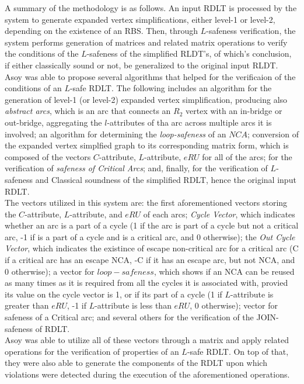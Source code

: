     A summary of the methodology is as follows. An input RDLT is processed by the system to generate expanded vertex simplifications, either level-1 or level-2, depending on the existence of an RBS. Then, through $L$-safeness verification, the system performs generation of matrices and related matrix operations to verify the conditions of the $L$-safeness of the simplified RLDT's, of which's conclusion, if either classically sound or not, be generalized to the original input RLDT. \\

    Asoy \cite{Asoy2024} was able to propose several algorithms that helped for the verificaion of the conditions of an $L$-safe RDLT. The following includes an algorithm for the generation of level-1 (or level-2) expanded vertex simplification, producing also \textit{abstract arcs}, which is an arc that connects an $R_2$ vertex with an in-bridge or out-bridge, aggregating the $l$-attributes of tha arc across multiple arcs it is involved; an algorithm for determining the \textit{loop-safeness} of an $NCA$; conversion of the expanded vertex simplfied graph to its corresponding matrix form, which is composed of the vectors $C$-attribute, $L$-attribute, $eRU$ for all of the arcs; for the verification of \textit{safeness of Critical Arcs}; and, finally, for the verification of $L$-safeness and Classical soundness of the simplified RDLT, hence the original input RDLT. \\

    The vectors utilized in this system are: the first aforementioned vectors storing the $C$-attribute, $L$-attribute, and $eRU$ of each arcs; \textit{Cycle Vector}, which indicates whether an arc is a part of a cycle (1 if the arc is part of a cycle but not a critical arc, -1 if is a part of a cycle and is a critical arc, and 0 otherwise); the \textit{Out Cycle Vector}, which indicates the existince of escape non-critical arc for a critical arc (C if a critical arc has an escape NCA, -C if it has an escape arc, but not NCA, and 0 otherwise); a vector for $loop-safeness$, which shows if an NCA can be reused as many times as it is required from all the cycles it is associated with, provied its value on the cycle vector is 1, or if its part of a cycle (1 if $L$-attribute is greater than $eRU$, -1 if $L$-attribute is less than $eRU$, 0 otherwise); vector for safeness of a Critical arc; and several others for the verification of the JOIN-safeness of RDLT. \\

    Asoy \cite{Asoy} was able to utilize all of these vectors through a matrix and apply related operations for the verification of properties of an $L$-safe RDLT. On top of that, they were also able to generate the components of the RDLT upon which violations were detected during the execution of the aforementioned operations. \\

